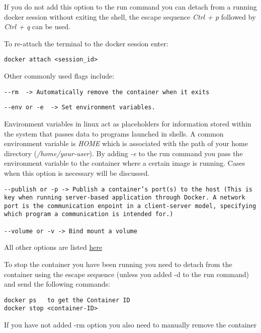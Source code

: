\documentclass[
]{book}
\begin{document}
If you do not add this option to the run command you can detach from a running docker session without exiting the shell, the escape sequence \emph{Ctrl + p} followed by \emph{Ctrl + q} can be used.

To re-attach the terminal to the docker session enter:

\begin{verbatim}
docker attach <session_id>
\end{verbatim}

Other commonly used flags include:

\begin{verbatim}
--rm  -> Automatically remove the container when it exits
\end{verbatim}

\begin{verbatim}
--env or -e  -> Set environment variables.
\end{verbatim}

Environment variables in linux act as placeholders for information stored within the system that passes data to programs launched in shells. A common environment variable is \emph{HOME} which is associated with the path of your home directory (\emph{/home/your-user}). By adding \emph{-e} to the run command you pass the environment variable to the container where a certain image is running. Cases when this option is necessary will be discussed.

\begin{verbatim}
--publish or -p -> Publish a container’s port(s) to the host (This is key when running server-based application through Docker. A network port is the communication enpoint in a client-server model, specifying which program a communication is intended for.)

--volume or -v -> Bind mount a volume 
\end{verbatim}

All other options are listed \href{https://docs.docker.com/engine/reference/commandline/run/}{here}

To stop the container you have been running you need to detach from the container using the escape sequence (unless you added -d to the run command) and send the following commands:

\begin{verbatim}
docker ps   to get the Container ID
docker stop <container-ID>  
\end{verbatim}

If you have not added -rm option you also need to manually remove the container
\end{document}
